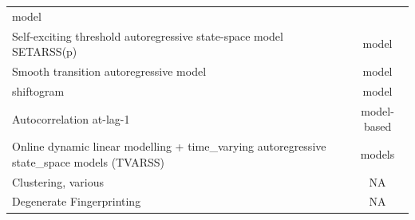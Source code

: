 \documentclass[12pt,twoside,openany]{reedthesis}
\begin{document}
\begin{longtable}[]{@{}lc@{}}
\begin{minipage}[t]{0.35\columnwidth}
model\strut
\end{minipage}\tabularnewline
\begin{minipage}[t]{0.43\columnwidth}\raggedright
Self-exciting threshold
autoregressive state-space
model SETARSS(p)\strut
\end{minipage} & \begin{minipage}[t]{0.35\columnwidth}\centering
model\strut
\end{minipage}\tabularnewline
\begin{minipage}[t]{0.43\columnwidth}\raggedright
Smooth transition
autoregressive model\strut
\end{minipage} & \begin{minipage}[t]{0.35\columnwidth}\centering
model\strut
\end{minipage}\tabularnewline
\begin{minipage}[t]{0.43\columnwidth}\raggedright
shiftogram\strut
\end{minipage} & \begin{minipage}[t]{0.35\columnwidth}\centering
model\strut
\end{minipage}\tabularnewline
\begin{minipage}[t]{0.43\columnwidth}\raggedright
Autocorrelation at-lag-1\strut
\end{minipage} & \begin{minipage}[t]{0.35\columnwidth}\centering
model-based\strut
\end{minipage}\tabularnewline
\begin{minipage}[t]{0.43\columnwidth}\raggedright
Online dynamic linear
modelling + time\_varying
autoregressive state\_space
models (TVARSS)\strut
\end{minipage} & \begin{minipage}[t]{0.35\columnwidth}\centering
models\strut
\end{minipage}\tabularnewline
\begin{minipage}[t]{0.43\columnwidth}\raggedright
Clustering, various\strut
\end{minipage} & \begin{minipage}[t]{0.35\columnwidth}\centering
NA\strut
\end{minipage}\tabularnewline
\begin{minipage}[t]{0.43\columnwidth}\raggedright
Degenerate Fingerprinting\strut
\end{minipage} & \begin{minipage}[t]{0.35\columnwidth}\centering
NA\strut
\end{minipage}\tabularnewline

\end{longtable}
\end{document}
